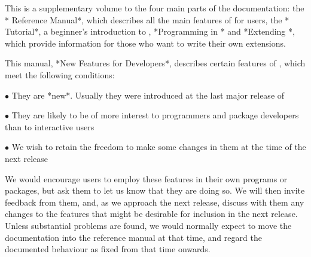 %
%
%
%

This is a supplementary volume to the four main parts of the {\GAP}
documentation: the *{\GAP} Reference Manual*, which describes all the 
main features of {\GAP} for users, the *{\GAP} Tutorial*, a
beginner's introduction to {\GAP}, *Programming in {\GAP}* and
*Extending {\GAP}*, which provide information for those who want to
write their own {\GAP} extensions.

This manual, *New Features for Developers*, describes certain
features of {\GAP}, which meet the following conditions: 

\beginlist
\item{$\bullet$} They are *new*. Usually they were introduced at the
last major release of {\GAP}
\item{$\bullet$} They are likely to be of more interest to {\GAP}
programmers and package developers than to interactive users
\item{$\bullet$} We wish to retain the freedom to make some changes in 
them at the time of the next release
\endlist

We would encourage users to employ these features in their own
{\GAP} programs or packages, but ask them to let us know that they are
doing so. We will then invite feedback from them, and, as we approach
the next release, discuss with them any changes to the features that
might be desirable for inclusion in the next release. Unless
substantial problems are found, we would normally expect to move the
documentation into the reference manual at that time, and regard the
documented behaviour as fixed from that time onwards.




